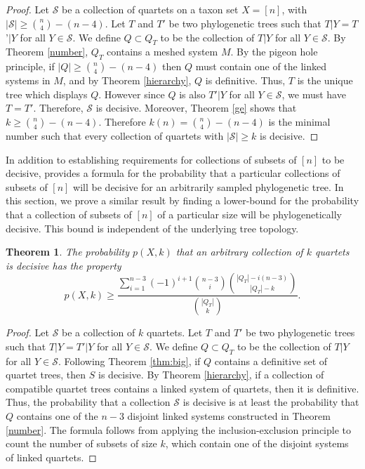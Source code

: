 \documentclass[final,3p,times]{elsarticle}
\newtheorem{thm}{Theorem}[section]
\theoremstyle{definition}
\theoremstyle{remark}
\begin{document}
\begin{proof}
Let $\mathcal{S}$ be a collection of quartets on a taxon set $X=[n]$, with $|\mathcal{S}| \ge {n \choose 4} - (n-4)$. Let $T$ and $T'$ be two phylogenetic trees such that $T|Y=T$'$|Y$ for all $Y \in \mathcal{S}$. We define $Q \subset Q_T$ to be the collection of $T|Y$ for all $Y \in \mathcal{S}$. By Theorem \ref{number}, $Q_T$ contains a meshed system $M$. By the pigeon hole principle, if  $|Q| \geq {n \choose 4} - (n-4)$ then $Q$ must contain one of the linked systems in $M$, and by Theorem \ref{hierarchy}, $Q$ is definitive.  Thus, $T$ is the unique tree which displays $Q$.  However since $Q$ is also $T'|Y$ for all $Y \in \mathcal{S}$, we must have $T=T'$.  Therefore, $\mathcal{S}$ is decisive. Moreover, Theorem \ref{ge} shows that $k \geq {n \choose 4} - (n-4)$.  Therefore  $k(n)={n \choose 4} - (n-4)$ is the minimal number such that every collection of quartets with $|\mathcal{S}| \geq k$ is decisive.
\end{proof}


In addition to establishing requirements for collections of subsets of $[n]$ to be decisive, \cite{steel} provides a formula for the probability that a particular collections of subsets of $[n]$ will be decisive for an arbitrarily sampled phylogenetic tree. In this section, we prove a similar result by finding a lower-bound for the probability that a collection of subsets of $[n]$ of a particular size will be phylogenetically decisive. This bound is independent of the underlying tree topology.

\begin{thm}
The probability $p(X,k)$ that an arbitrary collection of $k$ quartets is decisive has the property \[p(X,k) \geq \frac{\sum\limits_{i=1}^{n-3} (-1)^{i+1}{{n-3} \choose i}{{|Q_T|-i(n-3)} \choose {|Q_T|-k}}}{{|Q_T| \choose {k}}}.\]
\end{thm}

\begin{proof}
 Let $\mathcal{S}$ be a collection of $k$ quartets.  Let $T$ and $T'$ be two phylogenetic trees such that $T|Y=T'|Y$ for all $Y \in \mathcal{S}$. We define $Q \subset Q_T$ to be the collection of $T|Y$ for all $Y \in \mathcal{S}$.  Following Theorem \protect\ref{thm:big}, if $Q$ contains a definitive set of quartet trees, then $S$ is decisive.  By Theorem \protect\ref{hierarchy}, if a collection of compatible quartet trees contains a linked system of quartets, then it is definitive. Thus, the probability that a collection $\mathcal{S}$ is decisive is at least the probability that $Q$ contains one of the $n-3$ disjoint linked systems constructed in Theorem \protect\ref{number}. The formula follows from applying the inclusion-exclusion principle to count the number of subsets of size $k$, which contain one of the disjoint systems of linked quartets. 
\end{proof}
\end{document}
